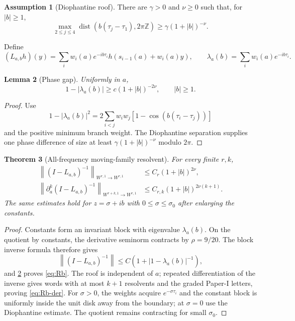 \documentclass[11pt,reqno]{amsart}
\newtheorem{theorem}{Theorem}[section]
\newtheorem{lemma}[theorem]{Lemma}
\theoremstyle{definition}
\newtheorem{assumption}[theorem]{Assumption}
\theoremstyle{remark}
\newcommand{\dist}{\operatorname{dist}}
\newcommand{\norm}[1]{\left\lVert #1\right\rVert}
\newcommand{\abs}[1]{\left\lvert #1\right\rvert}
\begin{document}
\begin{assumption}[Diophantine roof]\label{ass:dio}
There are $\gamma>0$ and $\nu\ge0$ such that, for $\abs b\ge1$,
\[
 \max_{2\le j\le4}
 \dist(b(\tau_j-\tau_1),2\pi\mathbb Z)
 \ge\gamma(1+\abs b)^{-\nu}.
\]
\end{assumption}

Define
\[
 (L_{a,b}h)(y)=\sum_iw_i(a)e^{-ib\tau_i}
 h(s_{i-1}(a)+w_i(a)y),
 \qquad
 \lambda_a(b)=\sum_iw_i(a)e^{-ib\tau_i}.
\]

\begin{lemma}[Phase gap]\label{lem:phase}
Uniformly in $a$,
\[
 1-\abs{\lambda_a(b)}
 \ge c(1+\abs b)^{-2\nu},
 \qquad\abs b\ge1.
\]
\end{lemma}

\begin{proof}
Use
\[
 1-\abs{\lambda_a(b)}^2
 =2\sum_{i<j}w_iw_j
 [1-\cos(b(\tau_i-\tau_j))]
\]
and the positive minimum branch weight.  The Diophantine separation supplies
one phase difference of size at least
$\gamma(1+\abs b)^{-\nu}$ modulo $2\pi$.
\end{proof}

\begin{theorem}[All-frequency moving-family resolvent]\label{thm:HF}
For every finite $r,k$,
\begin{align}
 \norm{(I-L_{a,b})^{-1}}_{W^{r,1}\to W^{r,1}}
 &\le C_r(1+\abs b)^{2\nu},\label{eq:Rb}\\
 \norm{\partial_a^k(I-L_{a,b})^{-1}}_{W^{r+k,1}\to W^{r,1}}
 &\le C_{r,k}(1+\abs b)^{2\nu(k+1)}.
 \label{eq:Rb-der}
\end{align}
The same estimates hold for $z=\sigma+ib$ with
$0\le\sigma\le\sigma_0$ after enlarging the constants.
\end{theorem}

\begin{proof}
Constants form an invariant block with eigenvalue $\lambda_a(b)$.  On the
quotient by constants, the derivative seminorm contracts by
$\rho=9/20$.  The block inverse formula therefore gives
\[
 \norm{(I-L_{a,b})^{-1}}
 \le C(1+\abs{1-\lambda_a(b)}^{-1}),
\]
and \cref{lem:phase} proves \eqref{eq:Rb}.  The roof is independent of $a$;
repeated differentiation of the inverse gives words with at most $k+1$
resolvents and the graded Paper-I letters, proving \eqref{eq:Rb-der}.
For $\sigma>0$, the weights acquire $e^{-\sigma\tau_i}$ and the constant block
is uniformly inside the unit disk away from the boundary; at $\sigma=0$ use
the Diophantine estimate.  The quotient remains contracting for small
$\sigma_0$.
\end{proof}
\end{document}
